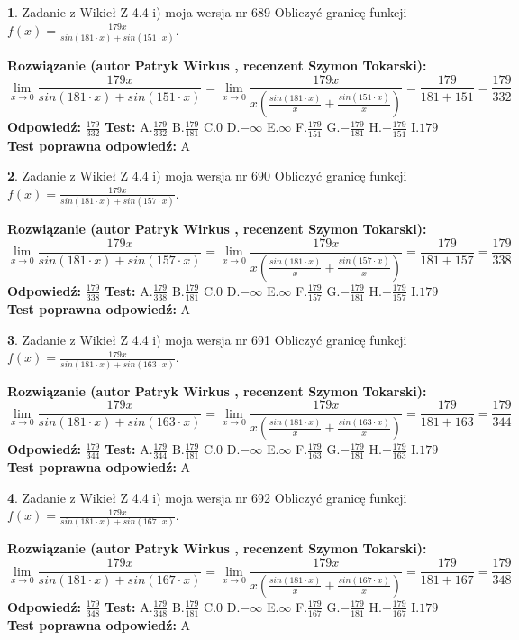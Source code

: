 \documentclass[12pt, a4paper]{article}
\theoremstyle{definition} %
\newtheorem{zad}{}
\newcommand{\zadStart}[1]{\begin{zad}#1\newline}
\newcommand{\zadStop}{\end{zad}}
\newcommand{\rozwStart}[2]{\noindent \textbf{Rozwiązanie (autor #1 , recenzent #2): }\newline}
\newcommand{\rozwStop}{\newline}
\newcommand{\odpStart}{\noindent \textbf{Odpowiedź:}\newline}
\newcommand{\odpStop}{\newline}
\newcommand{\testStart}{\noindent \textbf{Test:}\newline}
\newcommand{\testStop}{\newline}
\newcommand{\kluczStart}{\noindent \textbf{Test poprawna odpowiedź:}\newline}
\newcommand{\kluczStop}{\newline}
\begin{document}
\zadStart{Zadanie z Wikieł Z 4.4 i) moja wersja nr 689}
Obliczyć granicę funkcji $f(x)=\frac{179x}{sin(181\cdot x) +sin(151\cdot x)}$.
\zadStop
\rozwStart{Patryk Wirkus}{Szymon Tokarski}
$$\lim\limits_{x\to 0}\frac{179x}{sin(181\cdot x) +sin(151\cdot x)}=\lim\limits_{x\to 0}\frac{179x}{x(\frac{sin(181\cdot x)}{x}+\frac{sin(151\cdot x)}{x})}=\frac{179}{181+151} = \frac{179}{332}$$
\rozwStop
\odpStart
$\frac{179}{332}$
\odpStop
\testStart
A.$\frac{179}{332}$
B.$\frac{179}{181}$
C.$0$
D.$-\infty$
E.$\infty$
F.$\frac{179}{151}$
G.$-\frac{179}{181}$
H.$-\frac{179}{151}$
I.$179$
\testStop
\kluczStart
A
\kluczStop



\zadStart{Zadanie z Wikieł Z 4.4 i) moja wersja nr 690}
Obliczyć granicę funkcji $f(x)=\frac{179x}{sin(181\cdot x) +sin(157\cdot x)}$.
\zadStop
\rozwStart{Patryk Wirkus}{Szymon Tokarski}
$$\lim\limits_{x\to 0}\frac{179x}{sin(181\cdot x) +sin(157\cdot x)}=\lim\limits_{x\to 0}\frac{179x}{x(\frac{sin(181\cdot x)}{x}+\frac{sin(157\cdot x)}{x})}=\frac{179}{181+157} = \frac{179}{338}$$
\rozwStop
\odpStart
$\frac{179}{338}$
\odpStop
\testStart
A.$\frac{179}{338}$
B.$\frac{179}{181}$
C.$0$
D.$-\infty$
E.$\infty$
F.$\frac{179}{157}$
G.$-\frac{179}{181}$
H.$-\frac{179}{157}$
I.$179$
\testStop
\kluczStart
A
\kluczStop



\zadStart{Zadanie z Wikieł Z 4.4 i) moja wersja nr 691}
Obliczyć granicę funkcji $f(x)=\frac{179x}{sin(181\cdot x) +sin(163\cdot x)}$.
\zadStop
\rozwStart{Patryk Wirkus}{Szymon Tokarski}
$$\lim\limits_{x\to 0}\frac{179x}{sin(181\cdot x) +sin(163\cdot x)}=\lim\limits_{x\to 0}\frac{179x}{x(\frac{sin(181\cdot x)}{x}+\frac{sin(163\cdot x)}{x})}=\frac{179}{181+163} = \frac{179}{344}$$
\rozwStop
\odpStart
$\frac{179}{344}$
\odpStop
\testStart
A.$\frac{179}{344}$
B.$\frac{179}{181}$
C.$0$
D.$-\infty$
E.$\infty$
F.$\frac{179}{163}$
G.$-\frac{179}{181}$
H.$-\frac{179}{163}$
I.$179$
\testStop
\kluczStart
A
\kluczStop



\zadStart{Zadanie z Wikieł Z 4.4 i) moja wersja nr 692}
Obliczyć granicę funkcji $f(x)=\frac{179x}{sin(181\cdot x) +sin(167\cdot x)}$.
\zadStop
\rozwStart{Patryk Wirkus}{Szymon Tokarski}
$$\lim\limits_{x\to 0}\frac{179x}{sin(181\cdot x) +sin(167\cdot x)}=\lim\limits_{x\to 0}\frac{179x}{x(\frac{sin(181\cdot x)}{x}+\frac{sin(167\cdot x)}{x})}=\frac{179}{181+167} = \frac{179}{348}$$
\rozwStop
\odpStart
$\frac{179}{348}$
\odpStop
\testStart
A.$\frac{179}{348}$
B.$\frac{179}{181}$
C.$0$
D.$-\infty$
E.$\infty$
F.$\frac{179}{167}$
G.$-\frac{179}{181}$
H.$-\frac{179}{167}$
I.$179$
\testStop
\kluczStart
A
\kluczStop
\end{document}
